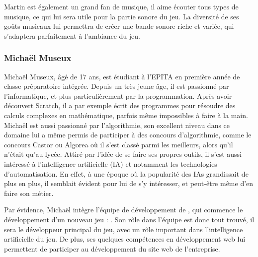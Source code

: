 Martin est également un grand fan de musique, il aime écouter tous types de musique, ce qui lui sera utile pour la partie sonore du jeu.
La diversité de ses goûts musicaux lui permettra de créer une bande sonore riche et variée, qui s'adaptera parfaitement à l'ambiance du jeu.


\subsubsection*{Michaël Museux}

Michaël Museux, âgé de 17 ans, est étudiant à l'EPITA en première année de classe préparatoire intégrée. 
Depuis un très jeune âge, il est passionné par l'informatique, et plus particulièrement par la programmation.
Après avoir découvert Scratch, il a par exemple écrit des programmes pour résoudre des calculs complexes en mathématique, parfois même impossibles à faire à la main.
Michaël est aussi passionné par l'algorithmie, son excellent niveau dans ce domaine lui a même permis de participer à des concours d'algorithmie, comme le concours Castor ou Algorea où il s'est classé parmi les meilleurs, alors qu'il n'était qu'au lycée. 
Attiré par l'idée de se faire ses propres outils, il s'est aussi intéressé à l’intelligence artificielle (IA) et notamment les technologies d’automatisation.
En effet, à une époque où la popularité des IAs grandissait de plus en plus, il semblait évident pour lui de s'y intéresser, et peut-être même d'en faire son métier.

Par évidence, Michaël intègre l'équipe de développement de \textit{\companyName}, qui commence le développement d'un nouveau jeu : \textit{\gameName}. 
Son rôle dans l'équipe est donc tout trouvé, il sera le développeur principal du jeu, avec un rôle important dans l'intelligence artificielle du jeu.
De plus, ses quelques compétences en développement web lui permettent de participer au développement du site web de l'entreprise.

